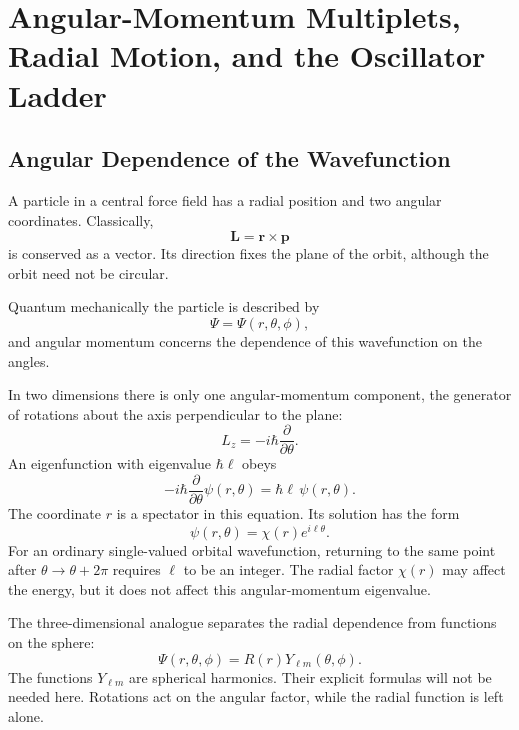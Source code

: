 \chapter{Angular-Momentum Multiplets, Radial Motion, and the Oscillator Ladder}

\section{Angular Dependence of the Wavefunction}

A particle in a central force field has a radial position and two angular coordinates. Classically,
\begin{equation}
\mathbf L=\mathbf r\times\mathbf p
\end{equation}
is conserved as a vector. Its direction fixes the plane of the orbit, although the orbit need not be circular.

Quantum mechanically the particle is described by
\begin{equation}
\Psi=\Psi(r,\theta,\phi),
\end{equation}
and angular momentum concerns the dependence of this wavefunction on the angles.

In two dimensions there is only one angular-momentum component, the generator of rotations about the axis perpendicular to the plane:
\begin{equation}
L_z=-i\hbar\frac{\partial}{\partial\theta}.
\end{equation}
An eigenfunction with eigenvalue \(\hbar\ell\) obeys
\begin{equation}
-i\hbar\frac{\partial}{\partial\theta}\psi(r,\theta)
=\hbar\ell\,\psi(r,\theta).
\end{equation}
The coordinate \(r\) is a spectator in this equation. Its solution has the form
\begin{equation}
\psi(r,\theta)=\chi(r)e^{i\ell\theta}.
\end{equation}
For an ordinary single-valued orbital wavefunction, returning to the same point after \(\theta\to\theta+2\pi\) requires \(\ell\) to be an integer. The radial factor \(\chi(r)\) may affect the energy, but it does not affect this angular-momentum eigenvalue.

The three-dimensional analogue separates the radial dependence from functions on the sphere:
\begin{equation}
\Psi(r,\theta,\phi)=R(r)Y_{\ell m}(\theta,\phi).
\end{equation}
The functions \(Y_{\ell m}\) are spherical harmonics. Their explicit formulas will not be needed here. Rotations act on the angular factor, while the radial function is left alone.

